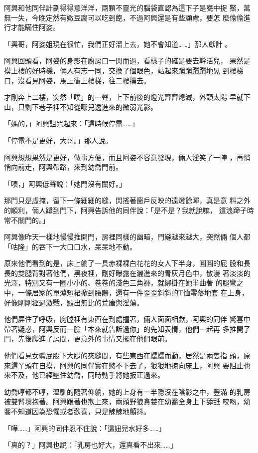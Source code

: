 阿興和他同伴計劃得得意洋洋，兩顆不靈光的腦袋直認為這下子是甕中捉
鱉，萬無一失，今晚定然有嫩豆腐可以吃到飽，不過阿興還是有些顧慮，要怎
麼偷偷進行才能瞞住阿姿。

「興哥，阿姿姐現在很忙，我們正好溜上去，她不會知道……」那人獻計
。

阿興回頭看，阿姿的身影在廚房口一閃而過，看樣子的確是要去幹活兒，
果然是摸上樓的好時機，倆人有志一同，交換了個眼色，站起來蹎蹎躓躓地晃
到樓梯口，沒看見阿姿，馬上衝上樓梯，往二樓撲去。

才剛奔上二樓，突然「噗」的一聲，上下前後的燈光齊齊熄滅，外頭太陽
早就下山，只剩下巷子裡不知從哪兒透進來的微弱光影。

「媽的，」阿興詛咒起來：「這時候停電……」

「停電不是更好，大哥。」那人說。

阿興想想果然是更好，做事方便，而且阿姿不容意發現，倆人淫笑了一陣
，再悄悄向前走，阿興帶路，來到幼喬門前。

「喂，」阿興低聲說：「她門沒有關好。」

那門只是虛掩，留下一條細細的縫，閃搖著窗戶反映的遠燈餘暉，真是意
料之外的順利，倆人蹲到門下，阿興告訴他的同伴說：「是不是？我就說嘛，
這浪蹄子時常不關門的。」

阿興像昨天一樣地慢慢推開門，房裡同樣的幽暗，門縫越來越大，突然倆
個人都「咕隆」的吞下一大口口水，呆呆地不動。

原來他們看到的是，床上躺了一具赤裸裸白花花的女人下半身，圓圓的屁
股和長長的雙腿背對著他們，黑夜裡，剛好曝露在灑進來的青灰月色中，散漫
著淡淡的光澤，特別又有一圈小小的、卷卷的淺色三角褲，就綁掛在她半曲著
的腿彎之中，一條居家的單薄短裙掀到腰際，還有一件歪歪斜斜的T恤零落地套
在上身，好像剛剛經過激戰，顯出無比的荒唐與淫蕩。

他們屏住了呼吸，胸膛裡有東西在到處撞著，倆人面面相歔，阿興的同伴
驚喜中帶著疑惑，阿興反而一臉「本來就告訴過你」的先知表情，他們一起再
多推開了門，先後爬進了房間，更意外的事情又擺在他們眼前。

他們看見女體屁股下大腿的夾縫間，有些東西在蠕蠕而動，居然是兩隻指
頭，原來這丫頭在自摸，阿興的同伴實在憋不下去了，狠狠地掠向床上，阿興
要阻止也來不及，他已經壓住幼喬，同時動手將她扳正過來。

幼喬哼都不哼，溫馴的隨著仰躺，她的上身有一半隱沒在陰影之中，豐滿
的乳房被雙臂環抱著。阿興跟著也欺上來，兩頭野狼貪婪在幼喬全身上下舔舐
咬吻，幼喬不知道因為恐懼或者歡喜，只是觫觫地顫抖。

「嘩……」阿興的同伴忍不住說：「這妞兒水好多……」

「真的？」阿興也說：「乳房也好大，還真看不出來……」

